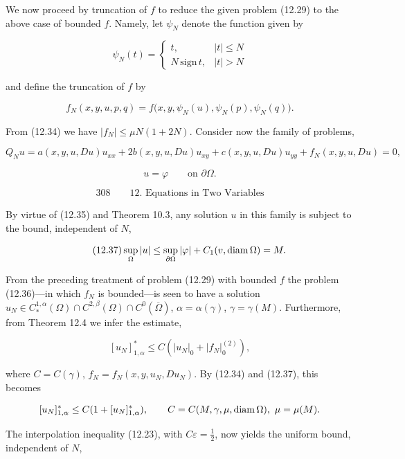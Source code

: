 We now proceed by truncation of $f$ to reduce the given problem (12.29) to the above case of bounded $f$. Namely, let $\psi_N$ denote the function given by

\[
\psi_N(t)=
\begin{cases}
t, & |t|\leq N\\
N\,\mathrm{sign}\,t, & |t|>N
\end{cases}
\]

and define the truncation of $f$ by

\[
f_N(x,y,u,p,q)=f\bigl(x,y,\psi_N(u),\psi_N(p),\psi_N(q)\bigr).
\]

From (12.34) we have $|f_N|\leq \mu N(1+2N)$. Consider now the family of problems,

\begin{equation}
\tag{12.36}
Q_Nu=a(x,y,u,Du)u_{xx}+2b(x,y,u,Du)u_{xy}+c(x,y,u,Du)u_{yy}
+f_N(x,y,u,Du)=0,
\end{equation}

\[
u=\varphi \qquad \text{on } \partial\Omega.
\]



\[
\text{308}
\qquad
\text{12.\ Equations in Two Variables}
\]

By virtue of (12.35) and Theorem 10.3, any solution $u$ in this family is subject to the
bound, independent of $N$,

\begin{equation}
\tag{12.37}
\sup_{\Omega} |u| \le \sup_{\partial \Omega} |\varphi| + C_1(v,\operatorname{diam} \Omega)=M.
\end{equation}

From the preceding treatment of problem (12.29) with bounded $f$ the problem
(12.36)---in which $f_N$ is bounded---is seen to have a solution
$u_N \in C^{1,\alpha}_*(\Omega)\cap C^{2,\beta}(\Omega)\cap C^0(\overline{\Omega})$,
$\alpha=\alpha(\gamma)$, $\gamma=\gamma(M)$. Furthermore, from Theorem 12.4 we infer
the estimate,

\begin{equation}
\tag{12.38}
[u_N]^*_{1,\alpha} \le C(|u_N|_0+|f_N|_0^{(2)}),
\end{equation}

where $C=C(\gamma)$, $f_N=f_N(x,y,u_N,Du_N)$. By (12.34) and (12.37), this becomes

\[
[u_N]^*_{1,\alpha} \le C(1+[u_N]^*_{1,\alpha}), \qquad C=C(M,\gamma,\mu,\diam \Omega), \ \mu=\mu(M).
\]

The interpolation inequality (12.23), with $C\varepsilon=\frac12$, now yields the uniform bound,
independent of $N$,

